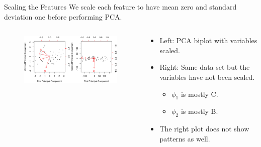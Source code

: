 \documentclass[
  ignorenonframetext,
  aspectratio=169,
]{beamer}
\begin{document}
\begin{frame}{Scaling the Features}
\protect\hypertarget{scaling-the-features}{}
\alert{We scale each feature to have mean zero and standard deviation one before performing PCA.}

\begin{columns}[T]
\begin{column}{0.7\textwidth}
\begin{figure}

{\centering \includegraphics[width=4.16667in,height=\textheight]{images/scaled_sunscaled.png}

}

\end{figure}
\end{column}

\begin{column}{0.3\textwidth}
\begin{itemize}
\item
  Left: PCA biplot with variables scaled.
\item
  Right: Same data set but the variables have not been scaled.

  \begin{itemize}
  \item
    \(\phi_1\) is mostly C.
  \item
    \(\phi_2\) is mostly B.
  \end{itemize}
\item
  The right plot does not show patterns as well.
\end{itemize}
\end{column}
\end{columns}
\end{frame}
\end{document}
